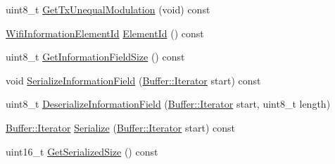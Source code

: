 \begin{DoxyCompactItemize}
\item 
uint8\+\_\+t \hyperlink{classns3_1_1HtCapabilities_a0f58c1668baf5b550f01c186849e8431}{Get\+Tx\+Unequal\+Modulation} (void) const 
\item 
\hyperlink{namespacens3_aeb185e0c8a60816016bca079f1420478}{Wifi\+Information\+Element\+Id} \hyperlink{classns3_1_1HtCapabilities_a665fe4ed7376a8e056d91c2cc89d70ec}{Element\+Id} () const 
\item 
uint8\+\_\+t \hyperlink{classns3_1_1HtCapabilities_acbc291f3aacf4448383ca73ecfe0ff4b}{Get\+Information\+Field\+Size} () const 
\item 
void \hyperlink{classns3_1_1HtCapabilities_ad4efe09efb638c5e75f32a2c77551476}{Serialize\+Information\+Field} (\hyperlink{classns3_1_1Buffer_1_1Iterator}{Buffer\+::\+Iterator} start) const 
\item 
uint8\+\_\+t \hyperlink{classns3_1_1HtCapabilities_ab446238e98254b5778cc209161e6f137}{Deserialize\+Information\+Field} (\hyperlink{classns3_1_1Buffer_1_1Iterator}{Buffer\+::\+Iterator} start, uint8\+\_\+t length)
\item 
\hyperlink{classns3_1_1Buffer_1_1Iterator}{Buffer\+::\+Iterator} \hyperlink{classns3_1_1HtCapabilities_a91a16fe63128b8463bbc8697de061645}{Serialize} (\hyperlink{classns3_1_1Buffer_1_1Iterator}{Buffer\+::\+Iterator} start) const 
\item 
uint16\+\_\+t \hyperlink{classns3_1_1HtCapabilities_a98fd319066a4073284918ecdc3682cff}{Get\+Serialized\+Size} () const 
\end{DoxyCompactItemize}
